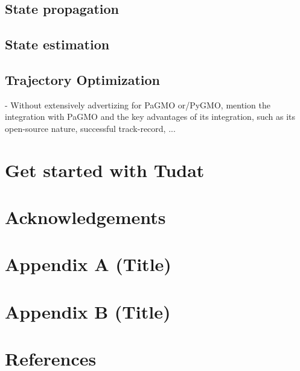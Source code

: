 \documentclass[]{IAC_style_updated}
\begin{document}
    \subsection{State propagation}
    

    \subsection{State estimation}
    

    \subsection{Trajectory Optimization}
    
    
    - Without extensively advertizing for PaGMO \lbrack or/PyGMO\rbrack, mention the integration with PaGMO and the key advantages of its integration, such as its open-source nature, successful track-record, ...

\section{Get started with Tudat}
    

\section*{Acknowledgements}

\section*{Appendix A (Title)}

\section*{Appendix B (Title)}

\section*{References}
\end{document}

